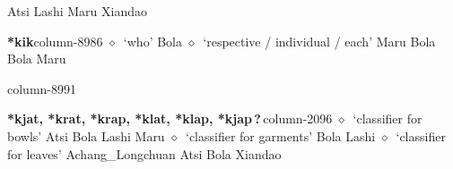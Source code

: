 \hspace{1ex}
         Atsi 
\hspace{1ex}
         Lashi 
\hspace{1ex}
         Maru 
\hspace{1ex}
         Xiandao 
  \item {\footnotesize \textbf{*kik}}{\tiny column-8986}
         $\diamond$~`who'
         Bola 
\hspace{1ex}
         $\diamond$~`respective / individual / each'
         Maru 
\hspace{1ex}
         Bola 
\hspace{1ex}
         Bola 
\hspace{1ex}
         Maru 
  \item {\footnotesize \textbf{}}{\tiny column-8991}
  \item {\footnotesize \textbf{*kjat, *krat, *krap, *klat, *klap, *kjap\,?\,}}{\tiny column-2096}
         $\diamond$~`classifier for bowls'
         Atsi 
\hspace{1ex}
         Bola 
\hspace{1ex}
         Lashi 
\hspace{1ex}
         Maru 
\hspace{1ex}
         $\diamond$~`classifier for garments'
         Bola 
\hspace{1ex}
         Lashi 
\hspace{1ex}
         $\diamond$~`classifier for leaves'
         Achang\_Longchuan 
\hspace{1ex}
         Atsi 
\hspace{1ex}
         Bola 
\hspace{1ex}
         Xiandao 
\hspace{1ex}
